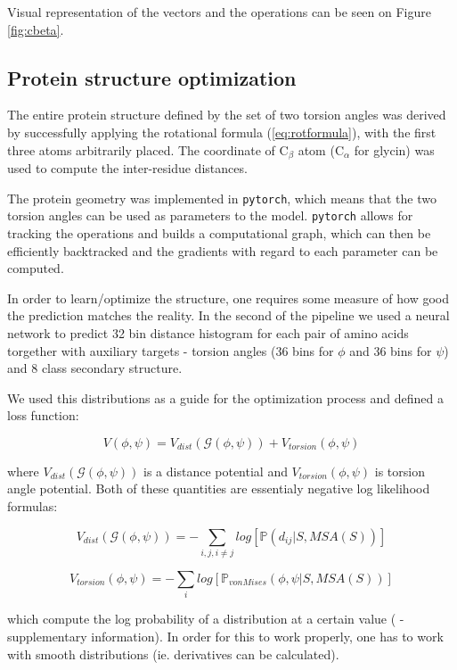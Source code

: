 Visual representation of the vectors and the operations can be seen on Figure \ref{fig:cbeta}.
\subsection{Protein structure optimization}

The entire protein structure defined by the set of two torsion angles was derived by successfully applying the rotational formula (\ref{eq:rotformula}), with the first three atoms arbitrarily placed. The coordinate of C$_\beta$ atom (C$_\alpha$ for glycin) was used to compute the inter-residue distances.

The protein geometry was implemented in \texttt{pytorch}, which means that the two torsion angles can be used as parameters to the model. \texttt{pytorch} allows for tracking the operations and builds a computational graph, which can then be efficiently backtracked and the gradients with regard to each parameter can be computed. 

In order to learn/optimize the structure, one requires some measure of how good the prediction matches the reality. In the second of the pipeline we used a neural network to predict 32 bin distance histogram for each pair of amino acids torgether with auxiliary targets - torsion angles (36 bins for $\phi$ and 36 bins for $\psi$) and 8 class secondary structure.

We used this distributions as a guide for the optimization process and defined a loss function:

\begin{equation}
    V(\phi, \psi) = V_{dist}(\mathcal{G}(\phi, \psi)) + V_{torsion}(\phi, \psi)
\end{equation}

where $ V_{dist}(\mathcal{G}(\phi, \psi))$ is a distance potential and $V_{torsion}(\phi, \psi)$ is torsion angle potential. Both of these quantities are essentialy negative log likelihood formulas:

\begin{equation}
     V_{dist}(\mathcal{G}(\phi, \psi)) = -\sum_{i, j, i \neq j} log[\mathds{P} (d_{ij} | S, MSA(S))]
\end{equation}

\begin{equation}
    V_{torsion}(\phi, \psi) = -\sum_{i} log[\mathds{P}_{von Mises} (\phi, \psi | S, MSA(S))]
\end{equation}

which compute the log probability of a distribution at a certain value (\cite{alphafold} - supplementary information). In order for this to work properly, one has to work with smooth distributions (ie. derivatives can be calculated).


